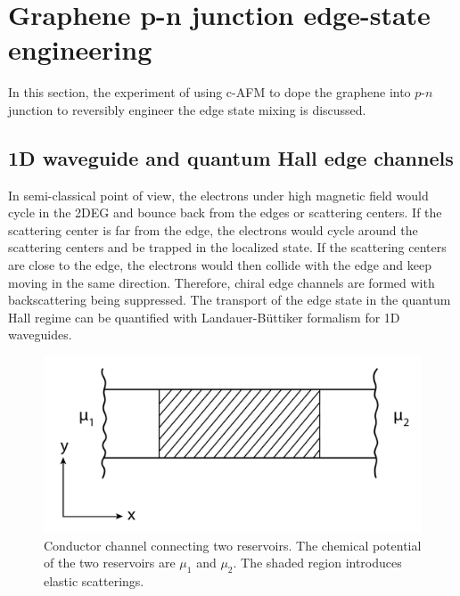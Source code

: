 \documentclass[pdflatex, sectionletters, 12pt]{pittetd}    %
\begin{document}
\section{Graphene p-n junction edge-state engineering}
\label{SEC:PNJunction}

In this section, the experiment of using c-AFM to dope the graphene into $p$-$n$ junction to reversibly engineer the edge state mixing is discussed.

\subsection{1D waveguide and quantum Hall edge channels}

In semi-classical point of view, the electrons under high magnetic field would cycle in the 2DEG and bounce back from the edges or scattering centers. If the scattering center is far from the edge, the electrons would cycle around the scattering centers and be trapped in the localized state. If the scattering centers are close to the edge, the electrons would then collide with the edge and keep moving in the same direction. Therefore, chiral edge channels are formed with backscattering being suppressed. The transport of the edge state in the quantum Hall regime can be quantified with Landauer-B{\"u}ttiker formalism for 1D waveguides\cite{buttiker1986four, buttiker1988absence}.
\\

\begin{figure}[h!]
	\centering
	\includegraphics[width=.5\textwidth]{Drawing/Channel.pdf}
	\caption{Conductor channel connecting two reservoirs. The chemical potential of the two reservoirs are $\mu_1$ and $\mu_2$. The shaded region introduces elastic scatterings.}
	\label{FIG:Channel}
\end{figure}
\end{document}
